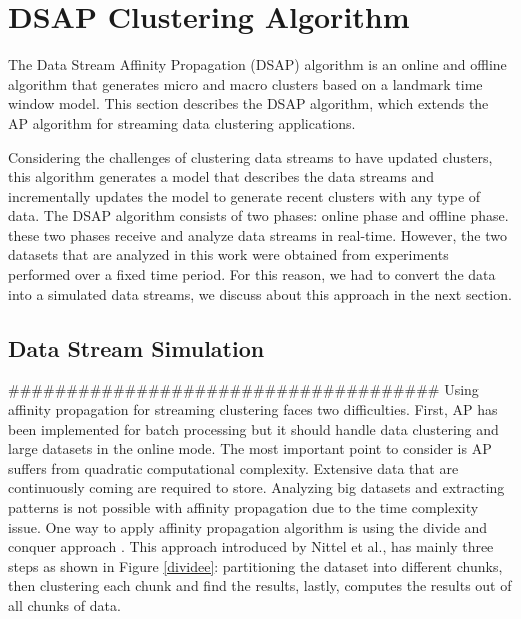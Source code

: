 \section{DSAP Clustering Algorithm}
The Data Stream Affinity Propagation (DSAP) algorithm is an online and offline algorithm that generates micro and macro clusters based on a landmark time window model. This section describes the DSAP algorithm, which extends the AP algorithm for streaming data clustering applications. 

Considering the challenges of clustering data streams to have updated clusters, this algorithm generates a model that describes the data streams and incrementally updates the model to generate recent clusters with any type of data. The DSAP algorithm consists of two phases: online phase and offline phase. these two phases receive and analyze data streams in real-time. However, the two datasets that are analyzed in this work were obtained from experiments performed over a fixed time period. For this reason, we had to convert the data into a simulated data streams, we discuss about this approach in the next section.

\subsection{Data Stream Simulation}

#####################################
 Using affinity propagation for streaming clustering faces two difficulties. First, AP has been implemented for batch processing but it should handle data clustering and large datasets in the online mode. The most important point to consider is AP suffers from quadratic computational complexity.
Extensive data that are continuously coming are required to store. Analyzing big datasets and extracting patterns is not possible with affinity propagation due to the time complexity issue.
One way to apply affinity propagation algorithm is using the divide and conquer approach \cite{khalilian2016data}. This approach introduced by Nittel et al.\cite{nittel2004scaling}, has mainly three steps as shown in Figure \ref{dividee}: partitioning the dataset into different chunks, then clustering each chunk and find the results, lastly, computes the results out of all chunks of data. 

